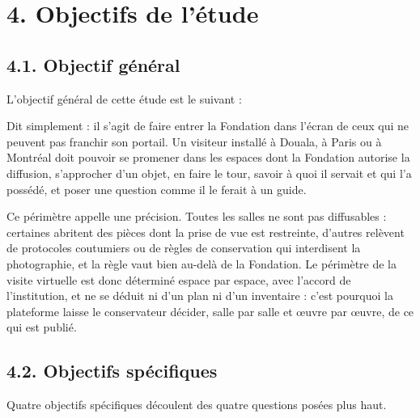 \section*{4. Objectifs de l'étude}

\subsection*{4.1. Objectif général}

L'objectif général de cette étude est le suivant :


Dit simplement : il s'agit de faire entrer la Fondation dans l'écran de ceux qui
ne peuvent pas franchir son portail. Un visiteur installé à Douala, à Paris ou à
Montréal doit pouvoir se promener dans les espaces dont la Fondation autorise la
diffusion, s'approcher d'un objet, en faire le tour, savoir à quoi il servait et
qui l'a possédé, et poser une question comme il le ferait à un guide.

Ce périmètre appelle une précision. Toutes les salles ne sont pas diffusables :
certaines abritent des pièces dont la prise de vue est restreinte, d'autres
relèvent de protocoles coutumiers ou de règles de conservation qui interdisent
la photographie, et la règle vaut bien au-delà de la Fondation. Le périmètre de
la visite virtuelle est donc déterminé espace par espace, avec l'accord de
l'institution, et ne se déduit ni d'un plan ni d'un inventaire : c'est pourquoi
la plateforme laisse le conservateur décider, salle par salle et œuvre par
œuvre, de ce qui est publié.

\subsection*{4.2. Objectifs spécifiques}

Quatre objectifs spécifiques découlent des quatre questions posées plus haut.

